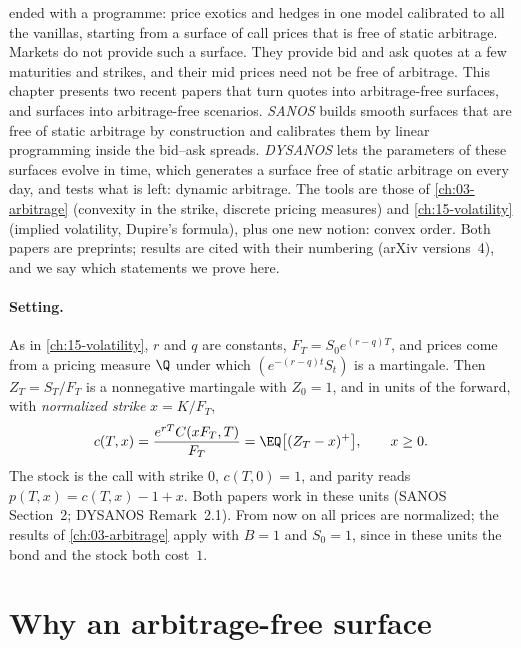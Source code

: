 
 ended with a programme: price exotics and hedges in one model calibrated to all
the vanillas, starting from a surface of call prices that is free of static arbitrage. Markets do not
provide such a surface. They provide bid and ask quotes at a few maturities and strikes, and their mid
prices need not be free of arbitrage. This chapter presents two recent papers that turn quotes into
arbitrage-free surfaces, and surfaces into arbitrage-free scenarios. \emph{SANOS}
\citep{buehler-sanos-2026} builds smooth surfaces that are free of static arbitrage by construction and
calibrates them by linear programming inside the bid--ask spreads. \emph{DYSANOS}
\citep{buehler-dysanos-2026} lets the parameters of these surfaces evolve in time, which generates a
surface free of static arbitrage on every day, and tests what is left: dynamic arbitrage. The tools are
those of \cref{ch:03-arbitrage} (convexity in the strike, discrete pricing measures) and
\cref{ch:15-volatility} (implied volatility, Dupire's formula), plus one new notion: convex order. Both
papers are preprints; results are cited with their numbering (arXiv versions~4), and we say which
statements we prove here.

\paragraph{Setting.} As in \cref{ch:15-volatility}, $r$ and $q$ are constants, $F_T=S_0e^{(r-q)T}$, and prices
come from a pricing measure $\Q$ under which $(e^{-(r-q)t}S_t)$ is a martingale. Then $Z_T=S_T/F_T$ is a
nonnegative martingale with $Z_0=1$, and in units of the forward, with \emph{normalized strike} $x=K/F_T$,
\begin{equation}\label{eq:afs-normalized}
  c(T,x)=\frac{e^{rT}C(xF_T,T)}{F_T}=\EQ\big[(Z_T-x)^+\big],\qquad x\ge0 .
\end{equation}
The stock is the call with strike $0$, $c(T,0)=1$, and parity reads $p(T,x)=c(T,x)-1+x$. Both papers work
in these units (SANOS Section~2; DYSANOS Remark~2.1). From now on all prices are normalized; the results
of \cref{ch:03-arbitrage} apply with $B=1$ and $S_0=1$, since in these units the bond and the stock both
cost~$1$.

\section{Why an arbitrage-free surface}\label{sec:afs-why}

